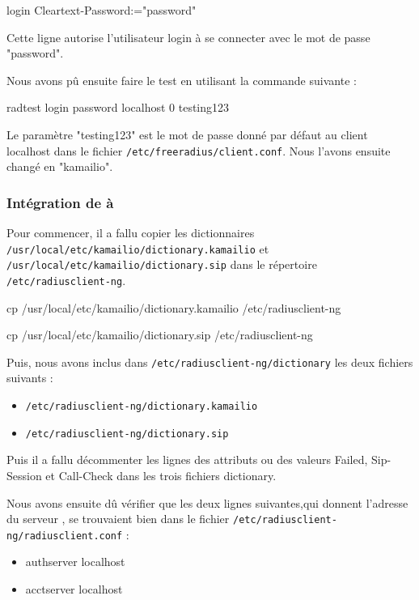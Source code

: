 login Cleartext-Password:="password"

Cette ligne autorise l'utilisateur login à se connecter avec le mot de passe "password".

Nous avons pû ensuite faire le test en utilisant la commande suivante :

\begin{shellcode}
radtest login password localhost 0 testing123
\end{shellcode}

Le paramètre "testing123" est le mot de passe donné par défaut au client localhost dans le fichier \texttt{/etc/freeradius/client.conf}. Nous l'avons ensuite changé en "kamailio".


\subsubsection{Intégration de {\rad} à {\kam}}

Pour commencer, il a fallu copier les dictionnaires \texttt{/usr/local/etc/kamailio/dictionary.kamailio} et \texttt{/usr/local/etc/kamailio/dictionary.sip} dans le répertoire \texttt{/etc/radiusclient-ng}.

\begin{shellcode}
cp /usr/local/etc/kamailio/dictionary.kamailio /etc/radiusclient-ng

cp /usr/local/etc/kamailio/dictionary.sip /etc/radiusclient-ng
\end{shellcode}

Puis, nous avons inclus dans \texttt{/etc/radiusclient-ng/dictionary} les deux fichiers suivants :

\begin{itemize}
\item{\texttt{/etc/radiusclient-ng/dictionary.kamailio}}
\item{\texttt{/etc/radiusclient-ng/dictionary.sip}}
\end{itemize}

Puis il a fallu décommenter les lignes des attributs ou des valeurs Failed, Sip-Session et Call-Check dans les trois fichiers dictionary.

Nous avons ensuite dû vérifier que les deux lignes suivantes,qui donnent l'adresse du serveur {\rad}, se trouvaient bien dans le fichier \texttt{/etc/radiusclient-ng/radiusclient.conf} :

\begin{itemize}
\item{authserver localhost}
\item{acctserver localhost}
\end{itemize}

